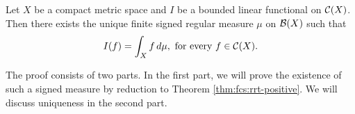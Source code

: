 \begin{theorem}
\label{thm:fcs:rrt-bounded}
Let $X$ be a compact metric space and $I$ be a bounded linear functional on ${\mathcal C}(X)$. Then there exists the unique finite signed regular measure $\mu$ on ${\mathcal B}(X)$ such that
\begin{equation}
    \label{eqn:fcs:rrt-bounded:claim}
    I (f) = \int_{X} f \,d\mu, \text{    for every $f \in {\mathcal C}(X)$}.
\end{equation}
\end{theorem}
\begin{proof-idea*}
The proof consists of two parts. In the first part, we will prove the existence of such a signed measure by reduction to Theorem \ref{thm:fcs:rrt-positive}. We will discuss uniqueness in the second part.
\end{proof-idea*}
